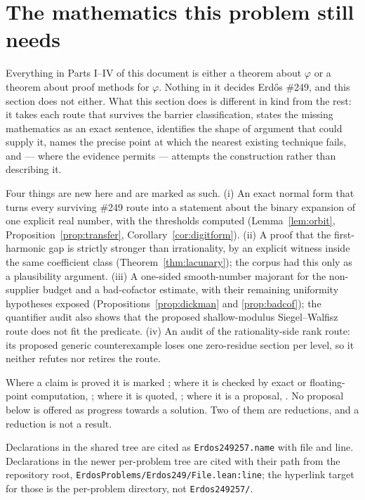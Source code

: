 \section{The mathematics this problem still needs}

Everything in Parts I--IV of this document is either a theorem about
$\varphi$ or a theorem about proof methods for $\varphi$. Nothing in it
decides Erd\H{o}s \#249, and this section does not either. What this section
does is different in kind from the rest: it takes each route that survives
the barrier classification, states the missing mathematics as an exact
sentence, identifies the shape of argument that could supply it, names the
precise point at which the nearest existing technique fails, and --- where
the evidence permits --- attempts the construction rather than describing it.

Four things are new here and are marked as such. (i) An exact normal form
that turns every surviving \#249 route into a statement about the binary
expansion of one explicit real number, with the thresholds computed
(Lemma~\ref{lem:orbit}, Proposition~\ref{prop:transfer},
Corollary~\ref{cor:digitform}). (ii) A proof that the first-harmonic gap is
strictly stronger than irrationality, by an explicit witness inside the same
coefficient class (Theorem~\ref{thm:lacunary}); the corpus had this only as
a plausibility argument. (iii) A one-sided smooth-number majorant for the
non-supplier budget and a bad-cofactor estimate, with their remaining
uniformity hypotheses exposed (Propositions~\ref{prop:dickman} and
\ref{prop:badcof}); the quantifier audit also shows that the proposed
shallow-modulus Siegel--Walfisz route does not fit the predicate. (iv) An
audit of the rationality-side rank route: its proposed generic counterexample
loses one zero-residue section per level, so it neither refutes nor retires
the route.

Where a claim is proved it is marked ; where it is checked by exact
or floating-point computation, ; where it is quoted, ;
where it is a proposal, . No proposal below is offered as progress
towards a solution. Two of them are reductions, and a reduction is not a
result.

\begin{rem}
Declarations in the shared tree are cited as
\texttt{Erdos249257.name} with file and line. Declarations in the newer
per-problem tree are cited with their path from the repository root,
\texttt{ErdosProblems/Erdos249/File.lean:line}; the hyperlink target for
those is the per-problem directory, not \texttt{Erdos249257/}.
\end{rem}

